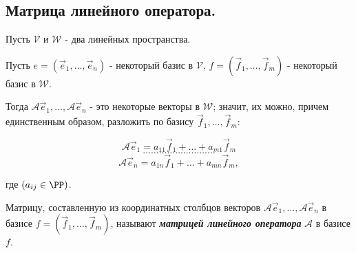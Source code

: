 \subsection{
    Матрица линейного оператора.
}

Пусть $\mathcal{V}$ и $\mathcal{W}$ - два линейных пространства.

Пусть $e = (\vec{e}_1, \ldots, \vec{e}_n)$ - некоторый базис в $\mathcal{V}$, $f = (\vec{f}_1, \ldots, \vec{f}_m)$ - некоторый базис в $\mathcal{W}$. 

Тогда $\mathscr{A}\vec{e}_1, \ldots, \mathscr{A}\vec{e}_n$ - это некоторые векторы в $\mathcal{W}$; значит, их можно, причем единственным образом, разложить по базису $\vec{f}_1, \ldots, \vec{f}_m$:

$$\mathscr{A}\vec{e}_1 = a_{11}\vec{f}_1 + \ldots + a_{m1}\vec{f}_m$$
$$\ldots \ldots \ldots \ldots \ldots \ldots \ldots \ldots \ldots$$
$$\mathscr{A}\vec{e}_n = a_{1n}\vec{f}_1 + \ldots + a_{mn}\vec{f}_m,$$

где $(a_{ij} \in \PP)$.

\begin{definition}
    Матрицу, составленную из координатных столбцов векторов $\mathscr{A}\vec{e}_1, \ldots, \mathscr{A}\vec{e}_n$ в базисе $f = (\vec{f}_1, \ldots, \vec{f}_m)$, называют \textit{\textbf{матрицей линейного оператора}} $\mathscr{A}$ в базисе $f$.
\end{definition}
